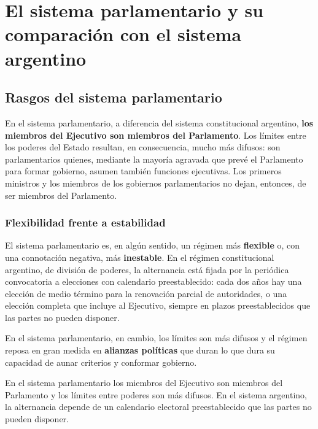\documentclass[12pt,oneside]{book}
\begin{document}
\chapter[El sistema parlamentario]{El sistema parlamentario y su comparación con el sistema argentino}

\section{Rasgos del sistema parlamentario}

En el sistema parlamentario, a diferencia del sistema constitucional argentino, \textbf{los miembros del Ejecutivo son miembros del Parlamento}. Los límites entre los poderes del Estado resultan, en consecuencia, mucho más difusos: son parlamentarios quienes, mediante la mayoría agravada que prevé el Parlamento para formar gobierno, asumen también funciones ejecutivas. Los primeros ministros y los miembros de los gobiernos parlamentarios no dejan, entonces, de ser miembros del Parlamento.

\subsection{Flexibilidad frente a estabilidad}

El sistema parlamentario es, en algún sentido, un régimen más \textbf{flexible} o, con una connotación negativa, más \textbf{inestable}. En el régimen constitucional argentino, de división de poderes, la alternancia está fijada por la periódica convocatoria a elecciones con calendario preestablecido: cada dos años hay una elección de medio término para la renovación parcial de autoridades, o una elección completa que incluye al Ejecutivo, siempre en plazos preestablecidos que las partes no pueden disponer.

En el sistema parlamentario, en cambio, los límites son más difusos y el régimen reposa en gran medida en \textbf{alianzas políticas} que duran lo que dura su capacidad de aunar criterios y conformar gobierno.

\begin{important}
En el sistema parlamentario los miembros del Ejecutivo son miembros del Parlamento y los límites entre poderes son más difusos. En el sistema argentino, la alternancia depende de un calendario electoral preestablecido que las partes no pueden disponer.
\end{important}
\end{document}
